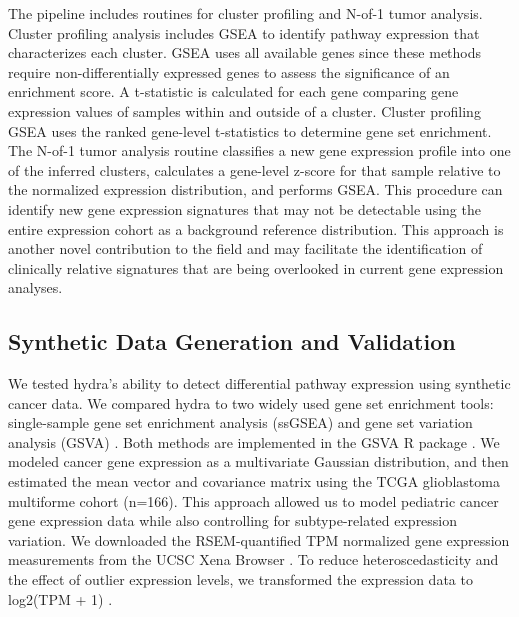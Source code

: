 \documentclass[10pt,letterpaper]{article}
\begin{document}
The pipeline includes routines for cluster profiling and N-of-1 tumor analysis. Cluster profiling analysis includes GSEA to identify pathway expression that characterizes each cluster. GSEA uses all available genes since these methods require non-differentially expressed genes to assess the significance of an enrichment score. A t-statistic is calculated for each gene comparing gene expression values of samples within and outside of a cluster. Cluster profiling GSEA uses the ranked gene-level t-statistics to determine gene set enrichment. The N-of-1 tumor analysis routine classifies a new gene expression profile into one of the inferred clusters, calculates a gene-level z-score for that sample relative to the normalized expression distribution, and performs GSEA. This procedure can identify new gene expression signatures that may not be detectable using the entire expression cohort as a background reference distribution. This approach is another novel contribution to the field and may facilitate the identification of clinically relative signatures that are being overlooked in current gene expression analyses.

\subsection*{Synthetic Data Generation and Validation}
We tested hydra's ability to detect differential pathway expression using synthetic cancer data. We compared hydra to two widely used gene set enrichment tools: single-sample gene set enrichment analysis (ssGSEA) and gene set variation analysis (GSVA) \cite{barbieSystematicRNAInterference2009, hanzelmannGSVAGeneSet2013, tarcaComparisonGeneSet2013}. Both methods are implemented in the GSVA R package \cite{hanzelmannGSVAGeneSet2013}. We modeled cancer gene expression as a multivariate Gaussian distribution, and then estimated the mean vector and covariance matrix using the TCGA glioblastoma multiforme cohort (n=166). This approach allowed us to model pediatric cancer gene expression data while also controlling for subtype-related expression variation. We downloaded the RSEM-quantified TPM normalized gene expression measurements from the UCSC Xena Browser \cite{goldmanUCSCXenaPlatform2018}. To reduce heteroscedasticity and the effect of outlier expression levels, we transformed the expression data to log2(TPM + 1) \cite{zwienerTransformingRNASeqData2014}.
 
\end{document}
